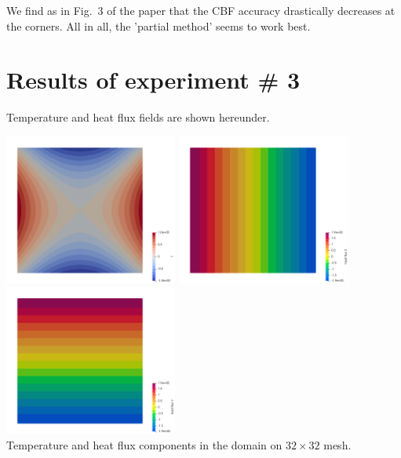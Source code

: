 We find as in Fig.~3 of the paper that the CBF accuracy drastically decreases at the corners.
All in all, the 'partial method' seems to work best.


\newpage
\section*{Results of experiment \# 3}

Temperature and heat flux fields are shown hereunder. 


\begin{center}
\includegraphics[width=5.7cm]{python_codes/fieldstone_173/results/exp3/T}
\includegraphics[width=5.7cm]{python_codes/fieldstone_173/results/exp3/qx}
\includegraphics[width=5.7cm]{python_codes/fieldstone_173/results/exp3/qy}\\
{\captionfont Temperature and heat flux components in the domain on $32 \times 32$ mesh.}
\end{center}

